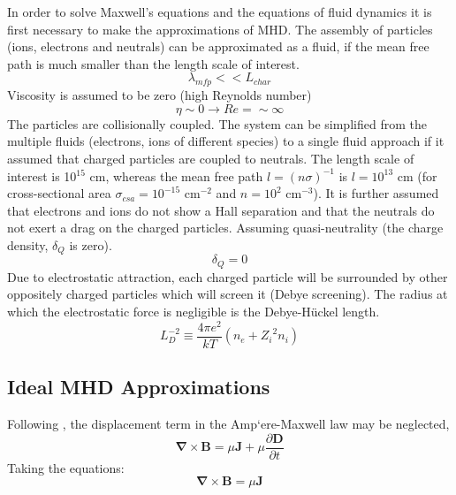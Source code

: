 In order to solve Maxwell's equations and the equations of fluid dynamics it is first necessary to make the approximations of MHD.
The assembly of particles (ions, electrons and neutrals) can be approximated as a fluid, if the mean free path is much smaller than the length scale of interest.
\begin{equation}
\lambda_{mfp} << L_{char}
\end{equation}
Viscosity is assumed to be zero (high Reynolds number) 
\begin{equation}
\eta \sim 0 \rightarrow Re= \sim \infty
\end{equation}
The particles are collisionally coupled.
The system can be simplified from the multiple fluids (electrons, ions of different species) to a single fluid approach if it assumed that charged particles are coupled to neutrals.
The length scale of interest is 10$^{15}$ cm, whereas the mean free path $l=(n\sigma)^{-1}$ is  $l=10^{13}$ cm (for cross-sectional area $\sigma_{csa} = 10^{-15}$ cm$^{-2}$ and $n=10^2$ cm$^{-3}$).
It is further assumed that electrons and ions do not show a Hall separation and that the neutrals do not exert a drag on the charged particles.
Assuming quasi-neutrality (the charge density, $\delta_Q$ is zero). 
\begin{equation}
\delta_{Q} = 0
\end{equation}
Due to electrostatic attraction, each charged particle will be surrounded by other oppositely charged particles which will screen it (Debye screening). The radius at which the electrostatic force is negligible is the Debye-H\"{u}ckel length. 
\begin{equation}
L_D^{-2} \equiv \frac{4\pi e^2}{kT}(n_e+{Z_i}^2 n_i)
\end{equation}

\subsection{Ideal MHD Approximations}

Following \citet{1975clel.book.....J}, the displacement term in the Amp\a`{e}re-Maxwell law may be neglected, 
\begin{equation}
\boldsymbol{\nabla}
\times
\mathbf{B}
= 
\mu
\mathbf{J} +
\mu
\frac{\partial \mathbf{D} }{\partial t} 
\end{equation}
Taking the equations:
\begin{equation}
\boldsymbol{\nabla}
\times
\mathbf{B}
= 
\mu
\mathbf{J} 
\end{equation}


